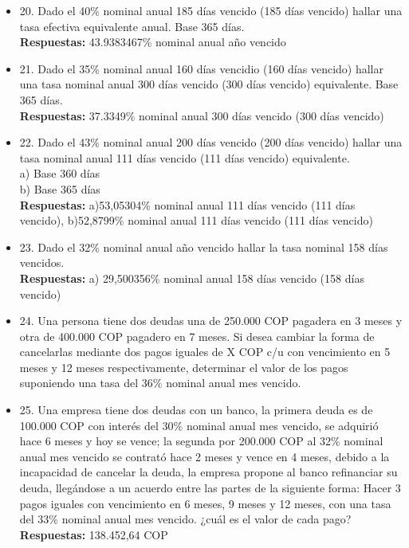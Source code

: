 \begin{itemize}
 \item 20. Dado el 40\% nominal anual 185 días vencido (185 días vencido) hallar una tasa efectiva equivalente anual. Base 365 días.\\
       \textbf{Respuestas:} 43.9383467\% nominal anual año vencido
       \medskip

 \item 21. Dado el 35\% nominal anual 160 días vencidio (160 días vencido) hallar una tasa nominal anual 300 días vencido (300 días vencido) equivalente. Base 365 días.\\
       \textbf{Respuestas:} 37.3349\% nominal anual 300 días vencido (300 días vencido)
       \medskip

 \item 22. Dado el 43\% nominal anual 200 días vencido (200 días vencido) hallar una tasa nominal anual 111 días vencido (111 días vencido) equivalente.\\

       a) Base 360 días\\
       b) Base 365 días\\

       \textbf{Respuestas:} a)53,05304\% nominal anual 111 días vencido (111 días vencido), b)52,8799\% nominal anual 111 días vencido (111 días vencido)
       \medskip

 \item 23. Dado el 32\% nominal anual año vencido hallar la tasa nominal 158 días vencidos. \\
       \textbf{Respuestas:} a) 29,500356\% nominal anual 158 días vencido (158 días vencido)
       \medskip

 \item 24. Una persona tiene dos deudas una de 250.000 COP pagadera en 3 meses y otra de 400.000 COP pagadero en 7 meses. Si desea cambiar la forma de cancelarlas mediante dos pagos iguales de X COP c/u con vencimiento en 5 meses y 12 meses respectivamente, determinar el valor de los pagos suponiendo una tasa del 36\% nominal anual mes vencido.\\
       \medskip

 \item 25. Una empresa tiene dos deudas con un banco, la primera deuda es de 100.000 COP con interés del 30\% nominal anual mes vencido, se adquirió hace 6 meses y hoy se vence; la segunda por 200.000 COP al 32\% nominal anual mes vencido se contrató hace 2 meses y vence en 4 meses, debido a la incapacidad de cancelar la deuda, la empresa propone al banco refinanciar su deuda, llegándose a un acuerdo entre las partes de la siguiente forma: Hacer 3 pagos iguales con vencimiento en 6 meses, 9 meses y 12 meses, con una tasa del 33\% nominal anual mes vencido. ¿cuál es el valor de cada pago?\\
       \textbf{Respuestas:} 138.452,64 COP
       \medskip


\end{itemize}
